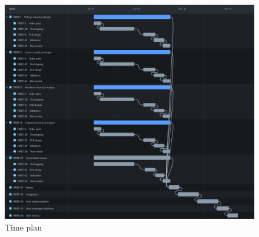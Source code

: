 \begin{figure}[h]
    \centering
    \includegraphics[width=1\linewidth]{images/SPROJ1G5_Timeline.png}
    \caption{Time plan}
    \label{fig:TP}
\end{figure}

\clearpage





